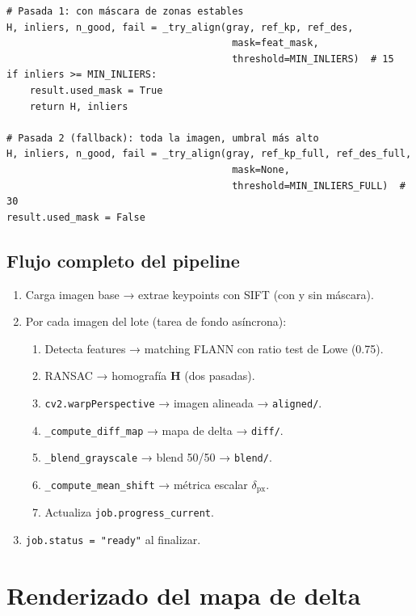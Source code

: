 \begin{codebox}
\begin{verbatim}
# Pasada 1: con máscara de zonas estables
H, inliers, n_good, fail = _try_align(gray, ref_kp, ref_des,
                                       mask=feat_mask,
                                       threshold=MIN_INLIERS)  # 15
if inliers >= MIN_INLIERS:
    result.used_mask = True
    return H, inliers

# Pasada 2 (fallback): toda la imagen, umbral más alto
H, inliers, n_good, fail = _try_align(gray, ref_kp_full, ref_des_full,
                                       mask=None,
                                       threshold=MIN_INLIERS_FULL)  # 30
result.used_mask = False
\end{verbatim}
\end{codebox}

\subsection{Flujo completo del pipeline}

\begin{enumerate}[leftmargin=1.5em]
  \item Carga imagen base → extrae keypoints con SIFT (con y sin máscara).
  \item Por cada imagen del lote (tarea de fondo asíncrona):
    \begin{enumerate}[leftmargin=1em]
      \item Detecta features → matching FLANN con ratio test de Lowe (0.75).
      \item RANSAC → homografía $\mathbf{H}$ (dos pasadas).
      \item \texttt{cv2.warpPerspective} → imagen alineada → \texttt{aligned/}.
      \item \texttt{\_compute\_diff\_map} → mapa de delta → \texttt{diff/}.
      \item \texttt{\_blend\_grayscale} → blend 50/50 → \texttt{blend/}.
      \item \texttt{\_compute\_mean\_shift} → métrica escalar $\delta_{\text{px}}$.
      \item Actualiza \texttt{job.progress\_current}.
    \end{enumerate}
  \item \verb|job.status = "ready"| al finalizar.
\end{enumerate}

\section{Renderizado del mapa de delta}

